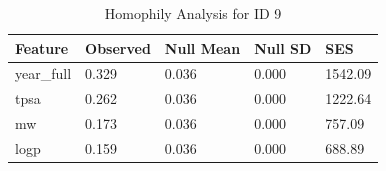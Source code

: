 \begin{table}
\caption{Homophily Analysis for ID 9}
\label{tab:homophily_id9}
\begin{tabular}{lllll}
\toprule
Feature & Observed & Null Mean & Null SD & SES \\
\midrule
year_full & 0.329 & 0.036 & 0.000 & 1542.09 \\
tpsa & 0.262 & 0.036 & 0.000 & 1222.64 \\
mw & 0.173 & 0.036 & 0.000 & 757.09 \\
logp & 0.159 & 0.036 & 0.000 & 688.89 \\
\bottomrule
\end{tabular}
\end{table}
